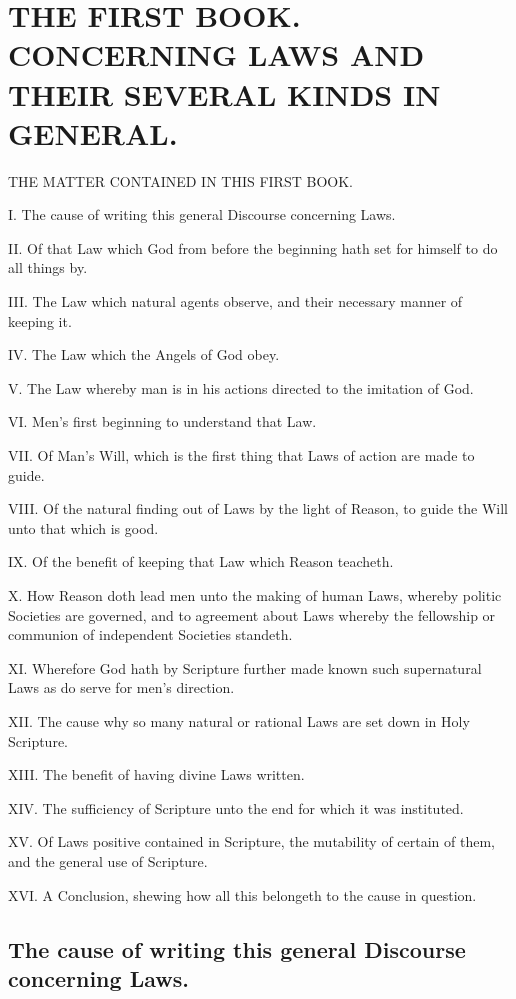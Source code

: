 \chapter*[The First Book]{THE FIRST BOOK. 
CONCERNING LAWS AND THEIR SEVERAL KINDS IN GENERAL.}
\label{chap:book1}

THE MATTER CONTAINED IN THIS FIRST BOOK.

I. The cause of writing this general Discourse concerning Laws.

II. Of that Law which God from before the beginning hath set for himself to do all things by.

III. The Law which natural agents observe, and their necessary manner of keeping it.

IV. The Law which the Angels of God obey.

V. The Law whereby man is in his actions directed to the imitation of God.

VI. Men’s first beginning to understand that Law.

VII. Of Man’s Will, which is the first thing that Laws of action are made to guide.

VIII. Of the natural finding out of Laws by the light of Reason, to guide the Will unto that which is good.

IX. Of the benefit of keeping that Law which Reason teacheth.

X. How Reason doth lead men unto the making of human Laws, whereby politic Societies are governed, and to agreement about Laws whereby the fellowship or communion of independent Societies standeth.

XI. Wherefore God hath by Scripture further made known such supernatural Laws as do serve for men’s direction.

XII. The cause why so many natural or rational Laws are set down in Holy Scripture.

XIII. The benefit of having divine Laws written.

XIV. The sufficiency of Scripture unto the end for which it was instituted.

XV. Of Laws positive contained in Scripture, the mutability of certain of them, and the general use of Scripture.

XVI. A Conclusion, shewing how all this belongeth to the cause in question.

\PRLsep

\section*{The cause of writing this general Discourse concerning Laws.}

